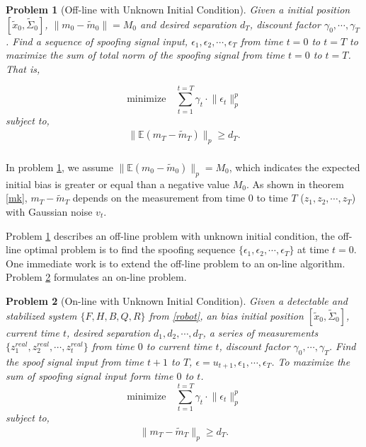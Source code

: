 \documentclass[letterpaper, 10 pt, conference]{ieeeconf}  %
\newtheorem{problem}{Problem}
\begin{document}
\begin{problem}  [Off-line with Unknown Initial Condition] \label{problem2}
Given a initial position $[\tilde{x}_0, \tilde{\Sigma}_0]$, $\lVert m_0 - \tilde{m}_0\lVert = M_0$ and  desired separation $d_T$, discount factor $\gamma_0,\cdots,\gamma_T$. Find a sequence of spoofing signal input, $\epsilon_1, \epsilon_2,\cdots,  \epsilon_{T} $ from time $t=0$ to $t=T$ to maximize the sum of total norm of the spoofing signal from time $t=0$ to $t=T$. That is, 

\begin{equation}
  \label{eq5}
 \text{minimize}   \quad \sum^{t=T}_{t=1} \gamma_t \cdot \lVert \epsilon_t\lVert_p^p 
\end{equation}
subject to,
\begin{equation} \label{problem2st} 
\begin{split}
\lVert \mathbb{E}(m_T  - \tilde{m}_T)\lVert_p  \ge d_T.\\
\end{split}
\end{equation}
\end{problem}

In problem \ref{problem2}, we assume $\lVert \mathbb{E}(m_0 - \tilde{m}_0)\lVert_p = M_0$, which indicates the expected initial bias is greater or equal than a negative value $M_0$.  As shown in theorem \ref{mk}, $m_T - \tilde{m}_T$ depends on the measurement from time $0$ to time $T$ ($z_1, z_2, \cdots,z_T$) with Gaussian noise $v_t$.


Problem \ref{problem2} describes an off-line problem with unknown initial condition, the off-line optimal problem is to find the spoofing sequence $\{ \epsilon_1, \epsilon_2,\cdots, \epsilon_T \}$ at time $t=0$. One immediate work is to extend the off-line problem to an on-line algorithm. Problem \ref{problem3} formulates an on-line problem.

\begin{problem} [On-line with Unknown Initial Condition] \label{problem3}
Given a detectable and stabilized system $\{F, H, B, Q, R \}$ from \eqref{robot}, an bias initial position $[\tilde{x}_0, \tilde{\Sigma}_0]$, current time $t$, desired separation $d_1,d_2,\cdots,d_T$, a series of measurements $\{z^{real}_1, z^{real}_2, \cdots, z^{real}_t \}$ from time $0$ to current time $t$, discount factor $\gamma_0,\cdots,\gamma_T$.  Find the spoof signal input from time $t+1$ to $T$, $\epsilon=u_{t+1}, \epsilon_1,\cdots,  \epsilon_{T}$. To maximize the sum of spoofing signal input form  time $0$ to $t$. 
\begin{equation}
  \label{eq5}
  \text{minimize}   \quad \sum^{t=T}_{t=1} \gamma_t \cdot \lVert \epsilon_t\lVert_p^p
\end{equation}
subject to,
\begin{equation}
\begin{split}
 \lVert m_T - \tilde{m}_T\lVert_p  \ge d_T.
\end{split}
\end{equation}
\end{problem}
\end{document}
